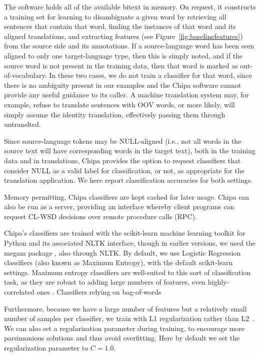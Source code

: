 The software holds all of the available bitext in memory. On request, it
constructs a training set for learning to disambiguate a given word
by retrieving all sentences that contain that word,
finding the instances of that word and its aligned translations, and extracting
features (see Figure~\ref{fig:baselinefeatures}) from the source side and its
annotations.
If a source-language word has been seen aligned to only one target-language
type, then this is simply noted, and if the source word is not present in the
training data, then that word is marked as out-of-vocabulary. In these two
cases, we do not train a classifier for that word, since there is no
ambiguity present in our examples and the Chipa software cannot provide any
useful guidance to its caller. A machine translation system may, for example,
refuse to translate sentences with OOV words, or more likely, will simply
assume the identity translation, effectively passing them through untranslted.

Since source-language tokens may be NULL-aligned (i.e., not all words in the
source text will have corresponding words in the target text), both in the
training data and in translations, Chipa provides the option to request
classifiers that consider NULL as a valid label for classification, or not, as
appropriate for the translation application. We here report classification
accuracies for both settings.

Memory permitting, Chipa classifiers are kept cached for later usage. Chipa can
also be run as a server, providing an interface whereby client programs can
request CL-WSD decisions over remote procedure calls (RPC).

Chipa's classifiers are trained with the scikit-learn machine learning toolkit
\cite{scikit-learn} for Python and its associated NLTK interface, though in
earlier versions, we used the megam package \cite{daume04cg-bfgs}, also through
NLTK.  By default, we use Logistic Regression classifiers (also known as
Maximum Entropy), with the default scikit-learn settings.
Maximum entropy classifiers are well-suited to this sort of classification
task, as they are robust to adding large numbers of features, even
highly-correlated ones \cite{nigam1999using}.
Classifiers relying on bag-of-words 

Furthermore, because we have a large number of features but a relatively small
number of samples per classifier, we train with L1 regularization rather than
L2~\cite{ng2004feature}.
We can also set a regularization parameter during training, to encourage
more parsimonious solutions and thus avoid overfitting.
Here by default we set the regularization parameter to $C=1.0$.

